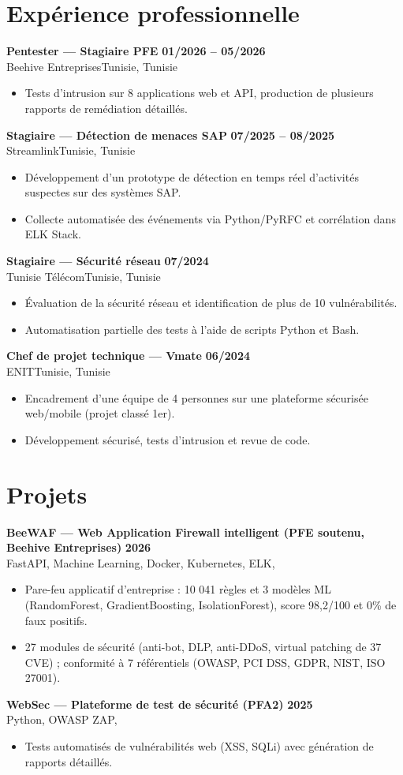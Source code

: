 \documentclass[a4paper,10pt]{article}
\newcommand{\cventry}[4]{%
  \textbf{#1} \hfill \textbf{#4}\\[1pt]
  #2{\ifx\relax#3\relax\else, #3\fi}\par\vspace{2pt}}
\begin{document}
\section{Expérience professionnelle}
\cventry{Pentester --- Stagiaire PFE}{Beehive Entreprises}{Tunisie}{01/2026 -- 05/2026}
\begin{itemize}
  \item Tests d'intrusion sur 8 applications web et API, production de plusieurs rapports de remédiation détaillés.
\end{itemize}
\cventry{Stagiaire — Détection de menaces SAP}{Streamlink}{Tunisie}{07/2025 -- 08/2025}
\begin{itemize}
  \item Développement d'un prototype de détection en temps réel d'activités suspectes sur des systèmes SAP.
  \item Collecte automatisée des événements via Python/PyRFC et corrélation dans ELK Stack.
\end{itemize}
\cventry{Stagiaire — Sécurité réseau}{Tunisie Télécom}{Tunisie}{07/2024}
\begin{itemize}
  \item Évaluation de la sécurité réseau et identification de plus de 10 vulnérabilités.
  \item Automatisation partielle des tests à l'aide de scripts Python et Bash.
\end{itemize}
\cventry{Chef de projet technique — Vmate}{ENIT}{Tunisie}{06/2024}
\begin{itemize}
  \item Encadrement d'une équipe de 4 personnes sur une plateforme sécurisée web/mobile (projet classé 1er).
  \item Développement sécurisé, tests d'intrusion et revue de code.
\end{itemize}

\section{Projets}
\cventry{BeeWAF — Web Application Firewall intelligent (PFE soutenu, Beehive Entreprises)}{FastAPI, Machine Learning, Docker, Kubernetes, ELK}{}{2026}
\begin{itemize}
  \item Pare-feu applicatif d'entreprise : 10 041 règles et 3 modèles ML (RandomForest, GradientBoosting, IsolationForest), score 98,2/100 et 0\% de faux positifs.
  \item 27 modules de sécurité (anti-bot, DLP, anti-DDoS, virtual patching de 37 CVE) ; conformité à 7 référentiels (OWASP, PCI DSS, GDPR, NIST, ISO 27001).
\end{itemize}
\cventry{WebSec — Plateforme de test de sécurité (PFA2)}{Python, OWASP ZAP}{}{2025}
\begin{itemize}
  \item Tests automatisés de vulnérabilités web (XSS, SQLi) avec génération de rapports détaillés.
\end{itemize}
\end{document}
